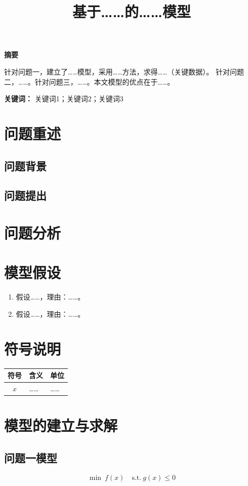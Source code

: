 \documentclass[12pt]{article}
\title{\textbf{基于……的……模型}}
\author{}
\date{}
\begin{document}
\begin{center}\Large\textbf{摘要}\end{center}
\noindent 针对问题一，建立了……模型，采用……方法，求得……（关键数据）。
针对问题二，……。针对问题三，……。本文模型的优点在于……。

\noindent\textbf{关键词：} 关键词1；关键词2；关键词3
\newpage

\section{问题重述}
\subsection{问题背景}
\subsection{问题提出}

\section{问题分析}

\section{模型假设}
\begin{enumerate}
  \item 假设……，理由：……。
  \item 假设……，理由：……。
\end{enumerate}

\section{符号说明}
\begin{table}[H]\centering
\begin{tabular}{cll}
\toprule
符号 & 含义 & 单位 \\
\midrule
$x$ & …… & …… \\
\bottomrule
\end{tabular}
\end{table}

\section{模型的建立与求解}
\subsection{问题一模型}
\begin{equation}
  \min\ f(x)\quad \text{s.t.}\ g(x)\le 0
\end{equation}
\end{document}
